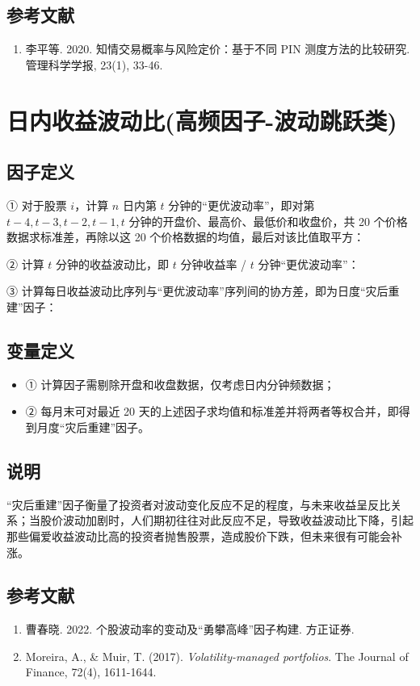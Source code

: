 \documentclass{article}
\begin{document}
\subsection{参考文献}
\begin{enumerate}
    \item 李平等. 2020. 知情交易概率与风险定价：基于不同 PIN 测度方法的比较研究. 管理科学学报, 23(1), 33-46.
\end{enumerate}

\section{日内收益波动比(高频因子-波动跳跃类)}

\subsection{因子定义}

① 对于股票 \( i \)，计算 \( n \) 日内第 \( t \) 分钟的“更优波动率”，即对第 \( t-4, t-3, t-2, t-1, t \) 分钟的开盘价、最高价、最低价和收盘价，共 20 个价格数据求标准差，再除以这 20 个价格数据的均值，最后对该比值取平方：

② 计算 \( t \) 分钟的收益波动比，即 \( t \) 分钟收益率 / \( t \) 分钟“更优波动率”：


③ 计算每日收益波动比序列与“更优波动率”序列间的协方差，即为日度“灾后重建”因子：

\subsection{变量定义}
\begin{itemize}
    \item ① 计算因子需剔除开盘和收盘数据，仅考虑日内分钟频数据；
    \item ② 每月末可对最近 20 天的上述因子求均值和标准差并将两者等权合并，即得到月度“灾后重建”因子。
\end{itemize}

\subsection{说明}
“灾后重建”因子衡量了投资者对波动变化反应不足的程度，与未来收益呈反比关系；当股价波动加剧时，人们期初往往对此反应不足，导致收益波动比下降，引起那些偏爱收益波动比高的投资者抛售股票，造成股价下跌，但未来很有可能会补涨。

\subsection{参考文献}
\begin{enumerate}
    \item 曹春晓. 2022. 个股波动率的变动及“勇攀高峰”因子构建. 方正证券.
    \item Moreira, A., \& Muir, T. (2017). \textit{Volatility-managed portfolios}. The Journal of Finance, 72(4), 1611-1644.
\end{enumerate}
\end{document}
